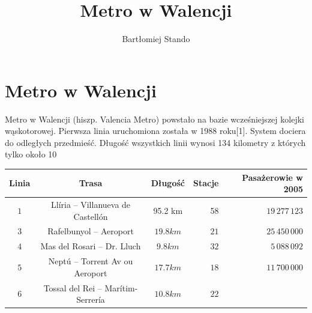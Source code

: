 \documentclass[a4paper,12pt]{article}
\title{Metro w Walencji}
\author{Bartłomiej Stando}
\begin{document}
\maketitle

\section{Metro w Walencji}
Metro w Walencji (hiszp. Valencia Metro) powstało na bazie wcześniejszej kolejki wąskotorowej. Pierwsza linia uruchomiona została w 1988 roku[1]. System dociera do odległych przedmieść. Długość wszystkich linii wynosi 134 kilometry z których tylko około 10%
\begin{table}[here]
\begin{tabular}{|c|c|c|r|r|}
\hline
Linia & Trasa & Długość & Stacje & Pasażerowie w 2005\\
\hline
\hline
$1$ & Llíria – Villanueva de Castellón & 95.2 km & 58 & $19\,277\,123$\\
\hline
$3$ & Rafelbunyol – Aeroport & $19.8km$ & $21$ & $25\,450\,000$\\
\hline
$4$ & Mas del Rosari – Dr. Lluch & $9.8km$ & $32$ & $5\,088\,092$\\
\hline
$5$ & Neptú – Torrent Av ou Aeroport & $17.7km$ & $18$ & $11\,700\,000$\\
\hline
$6$ & Tossal del Rei – Marítim-Serrería	 & $10.8km$ & $22$ &  \\
\hline
\end{tabular}
\end{table}
\end{document}
